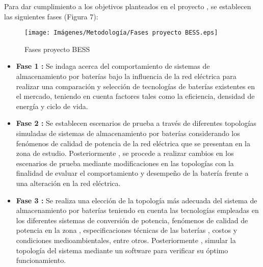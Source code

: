 Para dar cumplimiento a los objetivos planteados en el proyecto , se establecen  las siguientes fases  (Figura 7):

\begin{figure}[h!]
    \begin{center}
    \centering
    \texttt{[image: Imágenes/Metodología/Fases proyecto BESS.eps]}
	\caption{Fases proyecto BESS}
    \end{center}
\end{figure}



\begin{itemize}
    \item 
    \textbf{Fase 1 :} Se indaga acerca del comportamiento  de sistemas de almacenamiento por baterías bajo la influencia de la red eléctrica 
    para realizar una comparación y selección de tecnologías de baterías existentes en el mercado, teniendo en cuenta factores tales como la eficiencia, densidad de energía y ciclo de vida.
    \item 
   \textbf{Fase 2 : }Se establecen escenarios de prueba a través de diferentes topologías simuladas de sistemas de almacenamiento por baterías considerando los fenómenos de calidad de potencia de la red eléctrica que se presentan en la zona de estudio. Posteriormente , se procede a realizar cambios en los escenarios de prueba mediante modificaciones en las topologías con la finalidad de evaluar el comportamiento y desempeño de la batería frente a una alteración en la red eléctrica.
\newpage    
    \item 
    \textbf{Fase 3 : } Se realiza una  elección de la topología más adecuada del sistema de almacenamiento por baterías teniendo en cuenta las tecnologías empleadas en los diferentes sistemas de conversión de potencia, fenómenos de calidad de potencia en la zona , especificaciones técnicas de las baterías , costos  y condiciones medioambientales, entre otros. Posteriormente , simular la topología del sistema mediante un software para verificar su óptimo funcionamiento.
\end{itemize}


